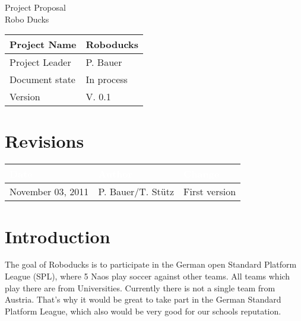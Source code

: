 \documentclass[12pt]{article}
\theoremstyle{definition}
\newenvironment{explanation}{%
   \setlength{\parindent}{0pt}
   \itshape
   \color{blue}
}{}
\newcommand{\projectname}{Roboducks}
\newcommand{\productname}{Robo Ducks}
\newcommand{\projectleader}{P. Bauer}
\newcommand{\documentstatus}{In process}
\newcommand{\version}{V. 0.1}
\begin{document}
\begin{titlepage}
\begin{flushright}

\end{flushright}

\vspace{10em}

\begin{center}
{\Huge Project Proposal} \\[3em]
{\LARGE \productname} \\[3em]
\end{center}

\begin{flushleft}
\begin{tabular}{|l|l|}
\hline
Project Name & \projectname \\ \hline
Project Leader & \projectleader \\ \hline
Document state & \documentstatus \\ \hline
Version & \version \\ \hline
\end{tabular}
\end{flushleft}

\end{titlepage}
\section*{Revisions}
\begin{tabular}{|l|l|l|}
\hline
\cellcolor[gray]{0.5}\textcolor{white}{Date} & \cellcolor[gray]{0.5}\textcolor{white}{Author} & \cellcolor[gray]{0.5}\textcolor{white}{Change} \\ \hline
November 03, 2011&P. Bauer/T. Stütz&First version \\ \hline
\end{tabular}
\pagebreak

\tableofcontents
\pagebreak

\section{Introduction}
\begin{explanation}
The goal of Roboducks is to participate in the German open Standard Platform League (SPL), where 5 Naos play soccer against other teams. All teams which play there are from Universities. Currently there is not a single team from Austria. That's why it would be great to take part in the German Standard Platform League, which also would be very good for our schools reputation.\\
\end{explanation}
\pagebreak
\end{document}
